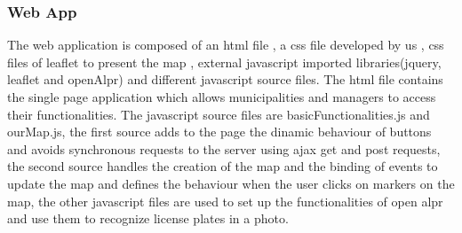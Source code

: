 \subsubsection{Web App}
The web application is composed of an html file , a css file developed by us , css files of leaflet to present the map , external javascript imported libraries(jquery, leaflet and openAlpr) and different javascript source files.
The html file contains the single page application which allows municipalities and managers to access their functionalities.
The javascript source files are basicFunctionalities.js and ourMap.js, the first source adds to the page the dinamic behaviour of buttons and avoids synchronous requests to the server using ajax get and post requests, the second source handles the creation of the map and the binding of events to update the map and defines the  behaviour when the user clicks on markers on the map, the other javascript files are used to set up the functionalities of open alpr and use them to recognize license plates in a photo.

